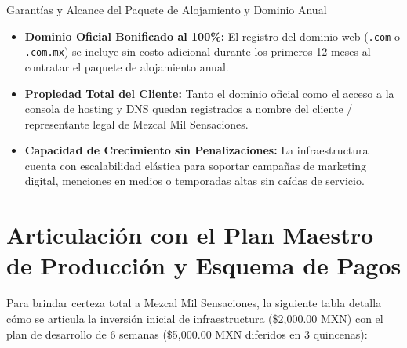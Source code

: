 \documentclass[11pt,letterpaper]{article}
\begin{document}
\vspace{0.4cm}

\begin{infobox}{Garantías y Alcance del Paquete de Alojamiento y Dominio Anual}
\footnotesize
\begin{itemize}[leftmargin=0.9cm,topsep=1.5pt,itemsep=2pt]
    \item \textbf{Dominio Oficial Bonificado al 100\%:} El registro del dominio web (\texttt{.com} o \texttt{.com.mx}) se incluye sin costo adicional durante los primeros 12 meses al contratar el paquete de alojamiento anual.
    \item \textbf{Propiedad Total del Cliente:} Tanto el dominio oficial como el acceso a la consola de hosting y DNS quedan registrados a nombre del cliente / representante legal de Mezcal Mil Sensaciones.
    \item \textbf{Capacidad de Crecimiento sin Penalizaciones:} La infraestructura cuenta con escalabilidad elástica para soportar campañas de marketing digital, menciones en medios o temporadas altas sin caídas de servicio.
\end{itemize}
\end{infobox}

\clearpage

\section{Articulación con el Plan Maestro de Producción y Esquema de Pagos}

Para brindar certeza total a Mezcal Mil Sensaciones, la siguiente tabla detalla cómo se articula la inversión inicial de infraestructura (\$2,000.00 MXN) con el plan de desarrollo de 6 semanas (\$5,000.00 MXN diferidos en 3 quincenas):

\vspace{0.15cm}
\end{document}
